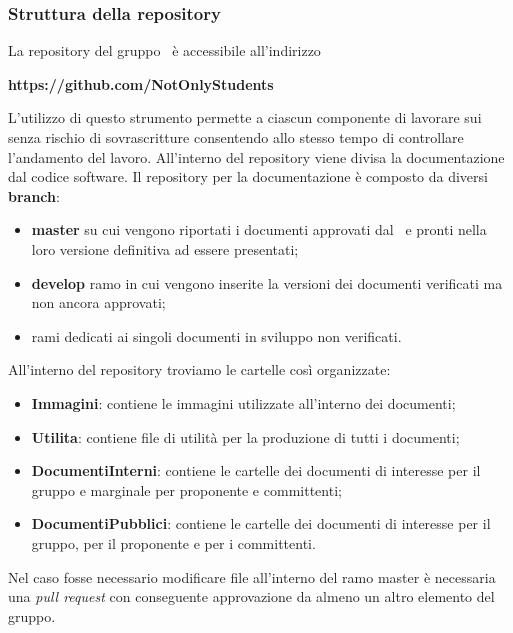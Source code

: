 \subsubsection{Struttura della repository}\label{StrutturaRepo}
La repository del gruppo \Gruppo\ è accessibile all'indirizzo
\begin{center}
	\textbf{https://github.com/NotOnlyStudents}
\end{center}
L'utilizzo di questo strumento permette a ciascun componente di lavorare sui  senza rischio di sovrascritture consentendo allo stesso tempo di controllare l'andamento del lavoro. 
All'interno del repository viene divisa la documentazione dal codice software.
\label{RepoDoc}
Il repository per la documentazione è composto da diversi \textbf{branch}:
\begin{itemize}
	\item \textbf{master} su cui vengono riportati i documenti approvati dal \Responsabile\ e pronti nella loro versione definitiva ad essere presentati;
	\item \textbf{develop} ramo in cui vengono inserite la versioni dei documenti verificati ma non ancora approvati;
	\item rami dedicati ai singoli documenti in sviluppo non verificati.
\end{itemize}
All'interno del repository troviamo le cartelle così organizzate:
\begin{itemize}
	\item \textbf{Immagini}: contiene le immagini utilizzate all'interno dei documenti;
	\item \textbf{Utilita}: contiene file di utilità per la produzione di tutti i documenti;
	\item \textbf{DocumentiInterni}: contiene le cartelle dei documenti di interesse per il gruppo e marginale per proponente e committenti;
	\item \textbf{DocumentiPubblici}: contiene le cartelle dei documenti di interesse per il gruppo, per il proponente e per i committenti.
\end{itemize}
\label{ModificaRepo}Nel caso fosse necessario modificare file all'interno del ramo master è necessaria una \textit{pull request} con conseguente approvazione da almeno un altro elemento del gruppo.